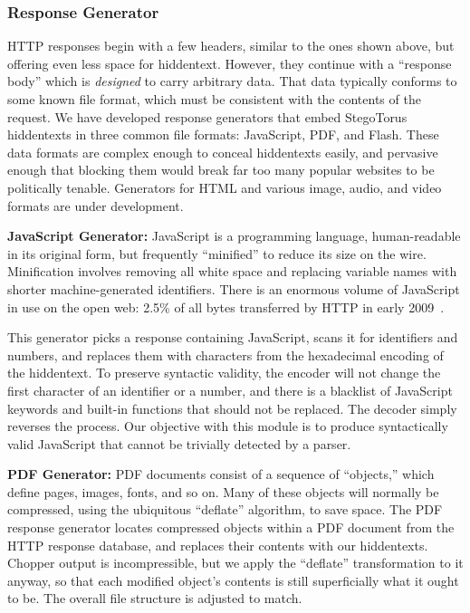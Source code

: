 \subsubsection{Response Generator}

HTTP responses begin with a few headers, similar to the ones shown
above, but offering even less space for hiddentext.  However, they
continue with a “response body” which is \emph{designed} to carry
arbitrary data.  That data typically conforms to some known file
format, which must be consistent with the contents of the request.  We
have developed response generators that embed StegoTorus hiddentexts
in three common file formats: JavaScript, PDF, and Flash.  These data
formats are complex enough to conceal hiddentexts easily, and
pervasive enough that blocking them would break far too many popular
websites to be politically tenable.  Generators for HTML and various
image, audio, and video formats are under development.

\smallskip\noindent\textbf{JavaScript Generator:} JavaScript is a
programming language, human-readable in its original form, but
frequently “minified” to reduce its size on the wire. Minification
involves removing all white space and replacing variable names with
shorter machine-generated identifiers.  There is an enormous volume of
JavaScript in use on the open web: 2.5\% of all bytes transferred by
HTTP in early 2009~\cite{a-res-traffic}.

This generator picks a response containing JavaScript, scans it for
identifiers and numbers, and replaces them with characters from the
hexadecimal encoding of the hiddentext.  To preserve syntactic validity,
the encoder will not change the first character of an identifier or a
number, and there is a blacklist of JavaScript keywords and built-in
functions that should not be replaced.  The decoder simply reverses
the process.  Our objective with this module is to produce syntactically
valid JavaScript that cannot be trivially detected by a parser.

\smallskip\noindent\textbf{PDF Generator:} PDF documents consist of a
sequence of “objects,” which define pages, images, fonts, and so on.
Many of these objects will normally be compressed, using the
ubiquitous “deflate” algorithm, to save space.  The PDF response
generator locates compressed objects within a PDF document from the
HTTP response database, and replaces their contents with our
hiddentexts.  Chopper output is incompressible, but we apply the
“deflate” transformation to it anyway, so that each modified object's
contents is still superficially what it ought to be.  The overall file
structure is adjusted to match.

